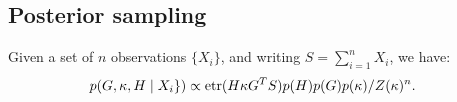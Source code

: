 \begin{comment}
While this approach to sampling from the prior is typically adequate, we obtain a different upper envelope to the Matrix Langevin distribution using results
from~\citep{Luke1972}.  In that work, two bounds were provided, both ideal for our purposes:
\begin{align}
  \frac{\Gamma(\nu+1)I_{\nu}(x)}{(x/2)^{\nu}} &\le e^x \left( \frac{1}{2\nu + 3} + \frac{2(\nu+1)}{2\nu+3}\left[1 + \frac{2\nu+3)x}{2(\nu+1)}\right]^{-1} \right)\quad x\ge0,\ \nu \ge -1/2,\\
  \frac{\Gamma(\nu+1)I_{\nu}(x)}{(x/2)^{\nu}} &\le \cosh(x) \quad x\ge0,\ \nu \ge -1/2
\end{align}
While, the latter is a bit more convenient, the former is tighter, and we shall use it in the following (referring to it as $b_{\nu}(x)$). For equation \eqref{eq:hoff_seq},
we have the following bound $B(X)$ on $K(X)$:
\begin{align}
 K(X) \le \prod_{r=1}^p  b_{d-r-1}(N^T_r F_{[,r]}) := B(X)
\end{align}
Now, a proposal from $\seq$ is acccepted with probability $K(X)/B(X)$.
By allowing the bound to depend on $X$, we can control the discrepancy between $B(X)$ and $K(X)$ resulting in fewer rejected samples, and greater efficiency.
Note though that our bound $B(X)$ is not uniformly tighter that the bound $B_u$ of~\citep{hoff2009}; in particular at the point $X = H$ on the Stiefel manifold,
$B(X) > K(X) = B_u$. On the other hand, our bound has the property that $\inf_{X \in V_{p,d}} K(X)/B(X) > \inf_{X \in V_{p,d}} K(X)/B_u$. This latter property will
be crucial for efficient posterior sampling. Of course, one can always combine the two bounds, defining $\hat{B}(X) = \min (B_u, B(X))$.
\end{comment}

\subsection{Posterior sampling}   \label{sec:post_sim}

Given a set of $n$ observations $\{X_i\}$, and writing $S = \sum_{i=1}^n X_i$, we have: 
\begin{align}
  p(G, \bkappa, H \mid X_i\}) & \propto {\etr(H \bkappa G^T S)p(H) p(G) p(\bkappa)}/{Z(\bkappa)^{n}}. \nonumber
\end{align}


